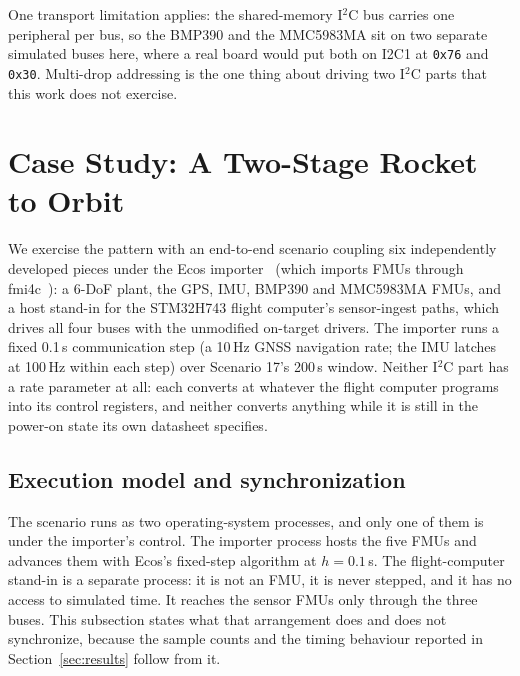 \documentclass[preprint,12pt,a4paper]{elsarticle}
\newcommand{\code}[1]{\texttt{\small #1}}
\begin{document}
One transport limitation applies: the shared-memory I$^2$C bus carries
one peripheral per bus, so the BMP390 and the MMC5983MA sit on two separate
simulated buses here, where a real board would put both on I2C1 at \code{0x76}
and \code{0x30}. Multi-drop addressing is the one thing about driving two
I$^2$C parts that this work does not exercise.

\section{Case Study: A Two-Stage Rocket to Orbit}
\label{sec:casestudy}
We exercise the pattern with an end-to-end scenario coupling six independently
developed pieces under the Ecos importer~\cite{ecos} (which imports
FMUs through fmi4c~\cite{fmi4c}): a 6-DoF plant, the GPS, IMU, BMP390 and
MMC5983MA FMUs, and a host stand-in for the STM32H743 flight computer's
sensor-ingest paths, which drives all four buses with the unmodified on-target
drivers. The importer runs a fixed 0.1\,s communication step (a 10\,Hz GNSS
navigation rate; the IMU latches at 100\,Hz within each step) over Scenario 17's
200\,s window. Neither I$^2$C part has a rate parameter at all: each converts at
whatever the flight computer programs into its control registers, and neither
converts anything while it is still in the power-on state its own datasheet
specifies.

\subsection{Execution model and synchronization}
\label{sec:sync}
The scenario runs as two operating-system processes, and only one of them is
under the importer's control. The importer process hosts the five FMUs and
advances them with Ecos's fixed-step algorithm at $h=0.1$\,s. The
flight-computer stand-in is a separate process: it is not an FMU, it is never
stepped, and it has no access to simulated time. It reaches the sensor FMUs
only through the three buses. This subsection states what that arrangement does
and does not synchronize, because the sample counts and the timing behaviour
reported in Section~\ref{sec:results} follow from it.
\end{document}
